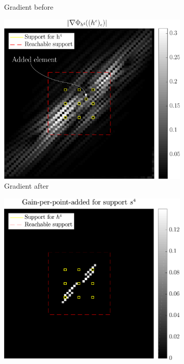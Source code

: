 \begin{figure}[!ht]
\begin{subfigure}[b]{0.32\linewidth}
\caption{Gradient before}\label{fig_beforeafter-grad_before}
\end{subfigure}
\begin{subfigure}[b]{0.32\linewidth}\centering
\includegraphics[width=\linewidth]{figures/before_after/xp_128x128_sc2_angl1_K3_S3_node4after_partgrad4.pdf}
\caption{Gradient after}\label{fig_beforeafter-grad_after}
\end{subfigure}
\begin{subfigure}[b]{0.32\linewidth}\centering
\includegraphics[width=\linewidth]{figures/before_after/xp_128x128_sc2_angl1_K3_S3_node4before_objmatrix_bestvalues.pdf}

\end{subfigure}
\end{figure}
